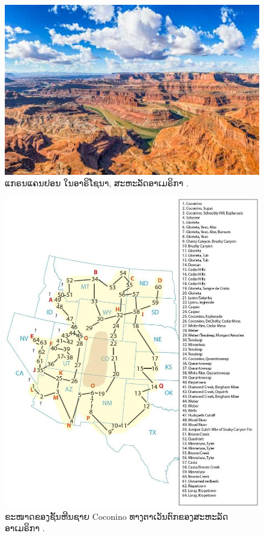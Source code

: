 \documentclass[10pt,twocolumn,letterpaper]{article}
\begin{document}
\begin{figure}[t]
\begin{center}
   \includegraphics[width=1\linewidth]{grand-canyon.jpg}
\end{center}
   \caption{ແກຣນແຄນຢອນ ໃນອາຣິໂຊນາ, ສະຫະລັດອາເມຣິກາ \cite{49}.}
\label{fig:2}
\label{fig:onecol}
\end{figure}

\begin{figure}[t]
\begin{center}
   \includegraphics[width=1\linewidth]{coconino.jpg}
\end{center}
   \caption{ຂະໜາດຂອງຊັ້ນຫີນຊາຍ Coconino ທາງຕາເວັນຕົກຂອງສະຫະລັດອາເມຣິກາ \cite{21}.}
\label{fig:3}
\label{fig:onecol}
\end{figure}
\end{document}
